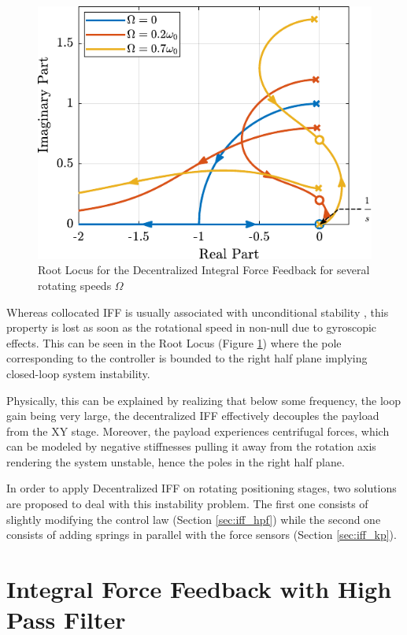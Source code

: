 \documentclass{ISMA_USD2020}
\begin{document}
\begin{figure}[htbp]
\centering
\includegraphics[scale=1]{figs/root_locus_pure_iff.pdf}
\caption{\label{fig:root_locus_pure_iff}Root Locus for the Decentralized Integral Force Feedback for several rotating speeds \(\Omega\)}
\end{figure}

Whereas collocated IFF is usually associated with unconditional stability \cite{preumont91_activ}, this property is lost as soon as the rotational speed in non-null due to gyroscopic effects.
This can be seen in the Root Locus (Figure \ref{fig:root_locus_pure_iff}) where the pole corresponding to the controller is bounded to the right half plane implying closed-loop system instability.

Physically, this can be explained by realizing that below some frequency, the loop gain being very large, the decentralized IFF effectively decouples the payload from the XY stage.
Moreover, the payload experiences centrifugal forces, which can be modeled by negative stiffnesses pulling it away from the rotation axis rendering the system unstable, hence the poles in the right half plane.

In order to apply Decentralized IFF on rotating positioning stages, two solutions are proposed to deal with this instability problem.
The first one consists of slightly modifying the control law (Section \ref{sec:iff_hpf}) while the second one consists of adding springs in parallel with the force sensors (Section \ref{sec:iff_kp}).

\section{Integral Force Feedback with High Pass Filter}
\label{sec:org0394efe}
\label{sec:iff_hpf}
\end{document}
